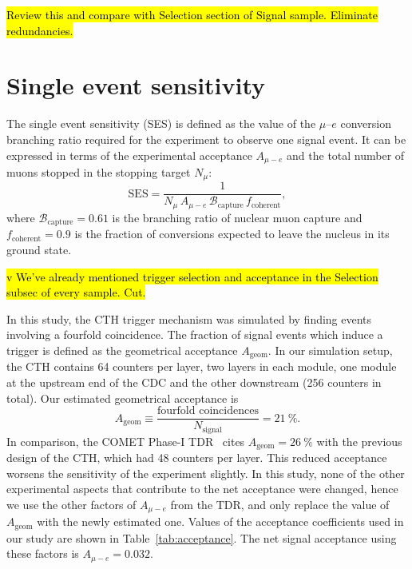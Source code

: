 \hl{ Review this and compare with Selection section of Signal sample. Eliminate
    redundancies.}


\section{Single event sensitivity}
The single event sensitivity (SES) is defined as the value of the $\mu$--$e$
conversion branching ratio required for the experiment to observe one signal
event. It can be expressed in terms of the experimental acceptance $A_{\mu-e}$ and the
total number of muons stopped in the stopping target $N_\mu$:
\begin{equation}
    \mathrm{SES} = \frac{1}{N_\mu\,A_{\mu-e}\,\mathcal{B}_\mathrm{capture}\,f_\mathrm{coherent}},
\end{equation}
where $\mathcal{B}_\mathrm{capture} = 0.61$ is the branching ratio of nuclear
muon capture and $f_\mathrm{coherent} = 0.9$ is the fraction of conversions
expected to leave the nucleus in its ground state.



\hl{ v We've already mentioned trigger selection and acceptance in the Selection
    subsec of every sample. Cut.}
    
In this study, the CTH trigger mechanism was simulated by finding events
involving a fourfold coincidence. The fraction of signal events which induce a
trigger is defined as the geometrical acceptance $A_\mathrm{geom}$. In our
simulation setup, the CTH contains 64 counters per layer, two layers
in each module, one module at the upstream end of the CDC and the other
downstream (256 counters in total). Our estimated geometrical acceptance is
$$
A_\mathrm{geom} \equiv \frac{\text{fourfold coincidences}}{N_\mathrm{signal}} = \SI{21}{\percent}.
$$
In comparison, the COMET Phase-I TDR~\cite{the_comet_collaboration_comet_2020}
cites $A_\mathrm{geom} = \SI{26}{\percent}$ with the previous design of the CTH,
which had 48 counters per layer. This reduced acceptance worsens the sensitivity
of the experiment slightly. In this study, none of the other experimental
aspects that contribute to the net acceptance were changed, hence we use the
other factors of $A_{\mu-e}$ from the TDR, and only replace the value of
$A_\mathrm{geom}$ with the newly estimated one. Values of the acceptance
coefficients used in our study are shown in Table~\ref{tab:acceptance}. The net
signal acceptance using these factors is $A_{\mu-e} = 0.032$.


